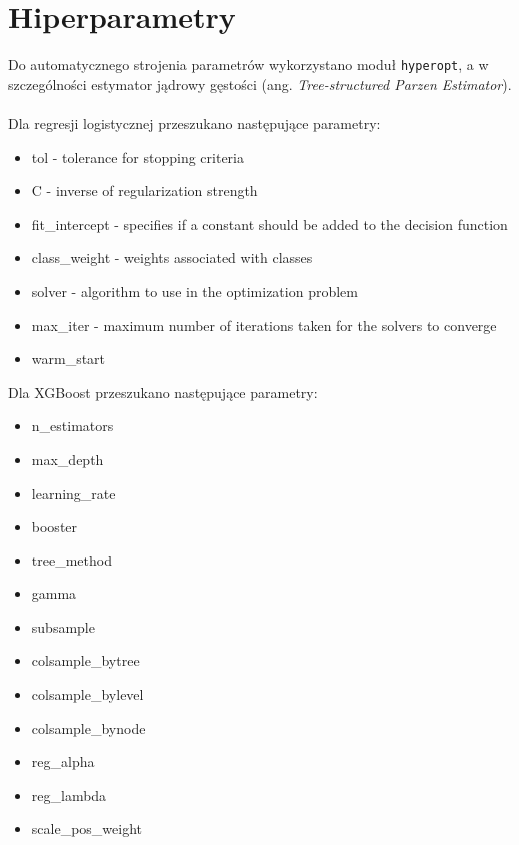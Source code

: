 \documentclass[12pt,a4paper]{article}
\begin{document}
\section*{Hiperparametry}
Do automatycznego strojenia parametrów wykorzystano moduł \texttt{hyperopt}, a w szczególności estymator jądrowy gęstości (ang. \textit{Tree-structured Parzen Estimator}).
\\
\\
Dla regresji logistycznej przeszukano następujące parametry:
\begin{itemize}
	\item tol - tolerance for stopping criteria
	\item C - inverse of regularization strength
	\item fit\_intercept - specifies if a constant should be added to the decision function
	\item class\_weight - weights associated with classes
	\item solver - algorithm to use in the optimization problem
	\item max\_iter - maximum number of iterations taken for the solvers to converge
	\item warm\_start
\end{itemize}
Dla XGBoost przeszukano następujące parametry:
\begin{itemize}
	\item n\_estimators
	\item max\_depth
	\item learning\_rate
	\item booster
	\item tree\_method
	\item gamma
	\item subsample
	\item colsample\_bytree
	\item colsample\_bylevel
	\item colsample\_bynode
	\item reg\_alpha
	\item reg\_lambda
	\item scale\_pos\_weight
\end{itemize}

\datatableA
\end{document}
